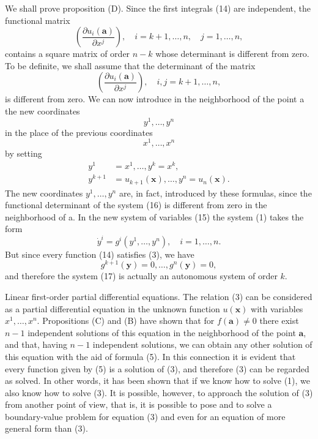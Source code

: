 \documentclass[10pt,a5paper]{book}
\theoremstyle{plain}
\theoremstyle{definition}
\theoremstyle{remark}
\begin{document}
We shall prove proposition (D). Since the first integrals (14) are independent, the functional matrix
\[
\left(\frac{\partial u_{i}(\mathbf{a})}{\partial x^{j}}\right), \quad i=k+1, \ldots, n, \quad j=1, \ldots, n,
\]
contains a square matrix of order $n-k$ whose determinant is different from zero. To be definite, we shall assume that the determinant of the matrix
\[
\left(\frac{\partial u_{i}(\mathbf{a})}{\partial x^{j}}\right), \quad i, j=k+1, \ldots, n,
\]
is different from zero. We can now introduce in the neighborhood of the point a the new coordinates
\begin{equation*}
y^{1}, \ldots, y^{n} \tag{15}
\end{equation*}
in the place of the previous coordinates
\[
x^{1}, \ldots, x^{n}
\]
by setting
\begin{align*}
y^{1} & =x^{1}, \ldots, y^{k}=x^{k}, \\
y^{k+1} & =u_{k+1}(\mathbf{x}), \ldots, y^{n}=u_{n}(\mathbf{x}) . \tag{16}
\end{align*}
The new coordinates $y^{1}, \ldots, y^{n}$ are, in fact, introduced by these formulas, since the functional determinant of the system (16) is different from zero in the neighborhood of a. In the new system of variables (15) the system (1) takes the form
\begin{equation*}
\dot{y}^{i}=g^{i}\left(y^{1}, \ldots, y^{n}\right), \quad i=1, \ldots, n . \tag{17}
\end{equation*}
But since every function (14) satisfies (3), we have
\[
g^{k+1}(\mathbf{y})=0, \ldots, g^{n}(\mathbf{y})=0,
\]
and therefore the system (17) is actually an autonomous system of order $k$.

Linear first-order partial differential equations. The relation (3) can be considered as a partial differential equation in the unknown function $u(\mathbf{x})$ with variables $x^{1}, \ldots, x^{n}$. Propositions (C) and (B) have shown that for $f(\mathbf{a}) \neq 0$ there exist $n-1$ independent solutions of this equation in the neighborhood of the point $\mathbf{a}$, and that, having $n-1$ independent solutions, we can obtain any other solution of this equation with the aid of formula (5). In this connection it is evident that every function given by (5) is a solution of (3), and therefore (3) can be regarded as solved. In other words, it has been shown that if we know how to solve (1), we also know how to solve (3). It is possible, however, to approach the solution of (3) from another point of view, that is, it is possible to pose and to solve a boundary-value problem for equation (3) and even for an equation of more general form than (3).
\end{document}
